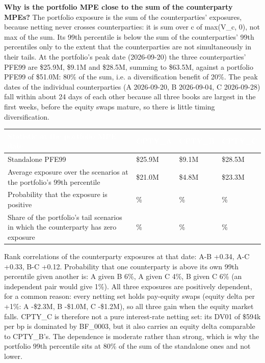 \documentclass[11pt,letterpaper]{article}
\begin{document}
\textbf{Why is the portfolio MPE close to the sum of the counterparty MPEs?} The portfolio exposure is the sum of the counterparties' exposures, because netting never crosses counterparties: it is sum over c of max(V\_c, 0), not max of the sum. Its 99th percentile is below the sum of the counterparties' 99th percentiles only to the extent that the counterparties are not simultaneously in their tails. At the portfolio's peak date (2026-09-20) the three counterparties' PFE99 are \$25.9M, \$9.1M and \$28.5M, summing to \$63.5M, against a portfolio PFE99 of \$51.0M: 80\% of the sum, i.e. a diversification benefit of 20\%. The peak dates of the individual counterparties (A 2026-09-20, B 2026-09-04, C 2026-09-28) fall within about 24 days of each other because all three books are largest in the first weeks, before the equity swaps mature, so there is little timing diversification.

{\scriptsize\setlength{\LTpre}{4pt}\setlength{\LTpost}{6pt}
\begin{longtable}{>{\raggedright\arraybackslash}p{}>{\raggedright\arraybackslash}p{}>{\raggedright\arraybackslash}p{}>{\raggedright\arraybackslash}p{}}
\toprule
\rowcolor{navy}\textbf{\textcolor{white}{Statistic at the portfolio MPE date}} & \textbf{\textcolor{white}{CPTY\_A}} & \textbf{\textcolor{white}{CPTY\_B}} & \textbf{\textcolor{white}{CPTY\_C}} \\
\endhead
Standalone PFE99 & \$25.9M & \$9.1M & \$28.5M \\
\rowcolor{gray!9}Average exposure over the scenarios at the portfolio's 99th percentile & \$21.0M & \$4.8M & \$23.3M \\
Probability that the exposure is positive & 51\% & 53\% & 52\% \\
\rowcolor{gray!9}Share of the portfolio's tail scenarios in which the counterparty has zero exposure & 0\% & 12\% & 0\% \\
\bottomrule
\end{longtable}}

Rank correlations of the counterparty exposures at that date: A-B +0.34, A-C +0.33, B-C +0.12. Probability that one counterparty is above its own 99th percentile given another is: A given B 6\%, A given C 4\%, B given C 6\% (an independent pair would give 1\%). All three exposures are positively dependent, for a common reason: every netting set holds pay-equity swaps (equity delta per +1\%: A -\$2.3M, B -\$1.0M, C -\$1.2M), so all three gain when the equity market falls. CPTY\_C is therefore not a pure interest-rate netting set: its DV01 of \$594k per bp is dominated by BF\_0003, but it also carries an equity delta comparable to CPTY\_B's. The dependence is moderate rather than strong, which is why the portfolio 99th percentile sits at 80\% of the sum of the standalone ones and not lower.
\end{document}
